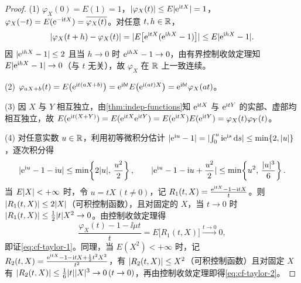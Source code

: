 \begin{proof}
(1) $\varphi_X(0)=E(1)=1$，$\lvert\varphi_X(t)\rvert\le E\lvert\mathrm{e}^{\mathrm{i} tX}\rvert=1$，$\varphi_X(-t)=E(\mathrm{e}^{-\mathrm{i} tX})=\overline{\varphi_X(t)}$。对任意 $t,h\in\mathbb{R}$，
\[
  \lvert\varphi_X(t+h)-\varphi_X(t)\rvert
  =\lvert E\bigl[\mathrm{e}^{\mathrm{i} tX}(\mathrm{e}^{\mathrm{i} hX}-1)\bigr]\rvert
  \le E\lvert\mathrm{e}^{\mathrm{i} hX}-1\rvert.
\]
因 $\lvert\mathrm{e}^{\mathrm{i} hX}-1\rvert\le 2$ 且当 $h\to 0$ 时 $\mathrm{e}^{\mathrm{i} hX}-1\to 0$，由有界控制收敛定理知 $E\lvert\mathrm{e}^{\mathrm{i} hX}-1\rvert\to 0$（与 $t$ 无关），故 $\varphi_X$ 在 $\mathbb{R}$ 上一致连续。

(2) $\varphi_{aX+b}(t)=E\bigl(\mathrm{e}^{\mathrm{i} t(aX+b)}\bigr)=\mathrm{e}^{\mathrm{i} bt}E\bigl(\mathrm{e}^{\mathrm{i}(at)X}\bigr)=\mathrm{e}^{\mathrm{i} bt}\varphi_X(at)$。

(3) 因 $X$ 与 $Y$ 相互独立，由\cref{thm:indep-functions}知 $\mathrm{e}^{\mathrm{i} tX}$ 与 $\mathrm{e}^{\mathrm{i} tY}$ 的实部、虚部均相互独立，故 $E(\mathrm{e}^{\mathrm{i} t(X+Y)})=E(\mathrm{e}^{\mathrm{i} tX}\mathrm{e}^{\mathrm{i} tY})=E(\mathrm{e}^{\mathrm{i} tX})E(\mathrm{e}^{\mathrm{i} tY})=\varphi_X(t)\varphi_Y(t)$。

(4) 对任意实数 $u\in\mathbb{R}$，利用初等微积分估计 $\lvert\mathrm{e}^{\mathrm{i} u}-1\rvert=\lvert\int_{0}^{u}\mathrm{i}\mathrm{e}^{\mathrm{i} s}\mathop{}\!\mathrm{d} s\rvert\le\min\{2,\lvert u\rvert\}$，逐次积分得
\[
  \lvert\mathrm{e}^{\mathrm{i} u}-1-\mathrm{i} u\rvert\le\min\!\left\{2\lvert u\rvert,\,\frac{u^2}{2}\right\},\qquad
  \lvert\mathrm{e}^{\mathrm{i} u}-1-\mathrm{i} u+\frac{u^2}{2}\rvert\le\min\!\left\{u^2,\,\frac{\lvert u\rvert^3}{6}\right\}.
\]
当 $E\lvert X\rvert<+\infty$ 时，令 $u=tX\,(t\ne 0)$，记 $R_1(t,X)=\frac{\mathrm{e}^{\mathrm{i} tX}-1-\mathrm{i} tX}{t}$。则 $\lvert R_1(t,X)\rvert\le 2\lvert X\rvert$（可积控制函数），且对固定的 $X$，当 $t\to 0$ 时 $\lvert R_1(t,X)\rvert\le\frac{1}{2}\lvert t\rvert X^2\to 0$。由控制收敛定理得
\[
  \frac{\varphi_X(t)-1-\ii\mu t}{t}=E\bigl[R_1(t,X)\bigr]\xrightarrow{t\to 0} 0,
\]
即证\eqref{eq:cf-taylor-1}。同理，当 $E(X^2)<+\infty$ 时，记 $R_2(t,X)=\frac{\mathrm{e}^{\mathrm{i} tX}-1-\mathrm{i} tX+\frac{1}{2}t^2 X^2}{t^2}$，有 $\lvert R_2(t,X)\rvert\le X^2$（可积控制函数）且对固定 $X$ 有 $\lvert R_2(t,X)\rvert\le\frac{1}{6}\lvert t\rvert\lvert X\rvert^3\to 0\,(t\to 0)$，再由控制收敛定理即得\eqref{eq:cf-taylor-2}。
\end{proof}

